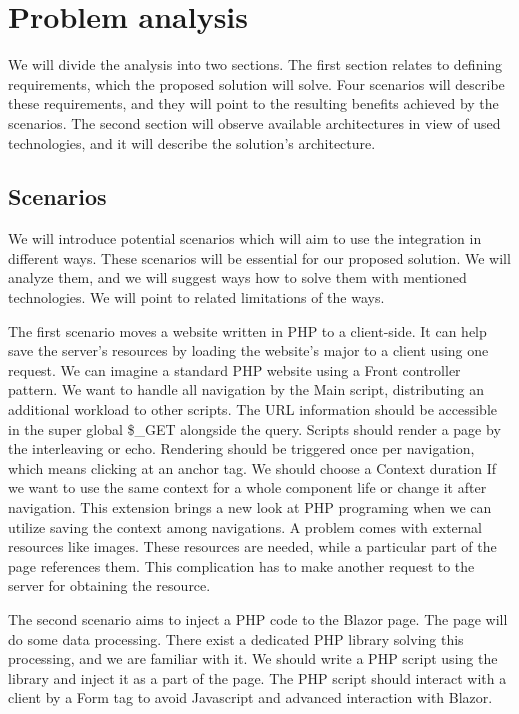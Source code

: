 \chapter{Problem analysis}

We will divide the analysis into two sections.
The first section relates to defining requirements, which the proposed solution will solve.
Four scenarios will describe these requirements, and they will point to the resulting benefits achieved by the scenarios.
The second section will observe available architectures in view of used technologies, and it will describe the solution's architecture.

\section{Scenarios}
We will introduce potential scenarios which will aim to use the integration in different ways.
These scenarios will be essential for our proposed solution.
We will analyze them, and we will suggest ways how to solve them with mentioned technologies.
We will point to related limitations of the ways.
\par
The first scenario moves a website written in PHP to a client-side.
It can help save the server's resources by loading the website's major to a client using one request.
We can imagine a standard PHP website using a Front controller pattern.
We want to handle all navigation by the Main script, distributing an additional workload to other scripts.
The URL information should be accessible in the super global \$\_GET alongside the query.
Scripts should render a page by the interleaving or echo.
Rendering should be triggered once per navigation, which means clicking at an anchor tag.
We should choose a Context duration If we want to use the same context for a whole component life or change it after navigation.
This extension brings a new look at PHP programing when we can utilize saving the context among navigations.
A problem comes with external resources like images.
These resources are needed, while a particular part of the page references them.
This complication has to make another request to the server for obtaining the resource.
\par
The second scenario aims to inject a PHP code to the Blazor page.
The page will do some data processing.
There exist a dedicated PHP library solving this processing, and we are familiar with it.
We should write a PHP script using the library and inject it as a part of the page.
The PHP script should interact with a client by a Form tag to avoid Javascript and advanced interaction with Blazor.
